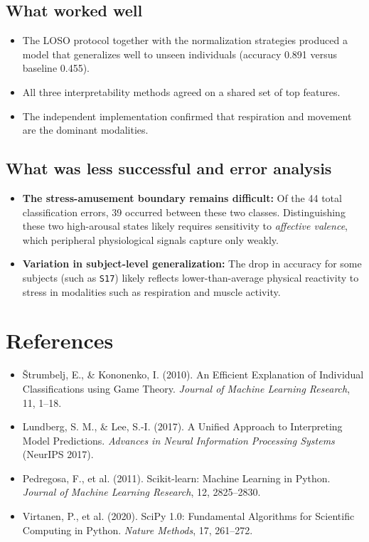 \documentclass[12pt,a4paper]{article}
\begin{document}
	\subsection{What worked well}
	
	\begin{itemize}
		\item The LOSO protocol together with the normalization strategies produced a model that generalizes well to unseen individuals (accuracy 0.891 versus baseline 0.455).
		\item All three interpretability methods agreed on a shared set of top features.
		\item The independent implementation confirmed that respiration and movement are the dominant modalities.
	\end{itemize}
	
	\subsection{What was less successful and error analysis}
	
	\begin{itemize}
		\item \textbf{The stress-amusement boundary remains difficult:} Of the 44 total classification errors, 39 occurred between these two classes. Distinguishing these two high-arousal states likely requires sensitivity to \textit{affective valence}, which peripheral physiological signals capture only weakly.
		\item \textbf{Variation in subject-level generalization:} The drop in accuracy for some subjects (such as \texttt{S17}) likely reflects lower-than-average physical reactivity to stress in modalities such as respiration and muscle activity.
	\end{itemize}
	
	\section{References}
	
	\begin{itemize}
		\item Štrumbelj, E., \& Kononenko, I. (2010). An Efficient Explanation of Individual Classifications using Game Theory. \textit{Journal of Machine Learning Research}, 11, 1--18.
		\item Lundberg, S. M., \& Lee, S.-I. (2017). A Unified Approach to Interpreting Model Predictions. \textit{Advances in Neural Information Processing Systems} (NeurIPS 2017).
		\item Pedregosa, F., et al. (2011). Scikit-learn: Machine Learning in Python. \textit{Journal of Machine Learning Research}, 12, 2825--2830.
		\item Virtanen, P., et al. (2020). SciPy 1.0: Fundamental Algorithms for Scientific Computing in Python. \textit{Nature Methods}, 17, 261--272.
	\end{itemize}
	
\end{document}
